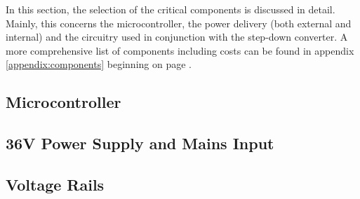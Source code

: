 In  this  section, the  selection  of  the  critical components  is  discussed
in  detail. Mainly,  this concerns  the  microcontroller,  the power  delivery
(both  external and  internal)  and  the circuitry  used  in conjunction  with
the  step-down converter. A  more comprehensive  list of  components including
costs can  be found  in appendix  \ref{appendix:components} beginning  on page
\pageref{appendix:components}.


\subsection{Microcontroller}



\subsection{36V Power Supply and Mains Input}



\subsection{Voltage Rails}




